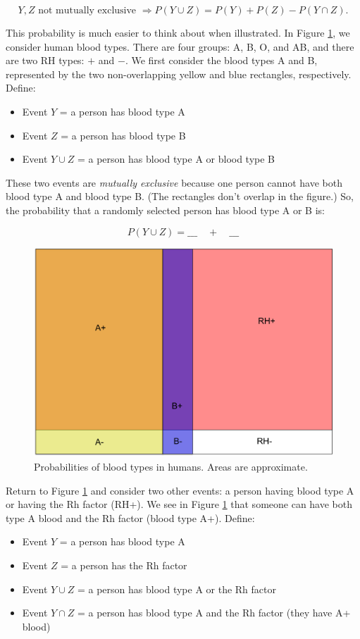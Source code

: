 \documentclass[]{book}
\providecommand{\tightlist}{%
  \setlength{\itemsep}{0pt}\setlength{\parskip}{0pt}}
\theoremstyle{definition}
\theoremstyle{definition}
\theoremstyle{remark}
\begin{document}
\[ Y,Z \text{ not mutually exclusive } \Rightarrow P(Y \cup Z) = P(Y) + P(Z) - P(Y \cap Z).\]

This probability is much easier to think about when illustrated. In
Figure \ref{fig:bloodvendiag}, we consider human blood types. There are
four groups: A, B, O, and AB, and there are two RH types: \(+\) and
\(-\). We first consider the blood types A and B, represented by the two
non-overlapping yellow and blue rectangles, respectively. Define:

\begin{itemize}
\tightlist
\item
  Event \(Y\) = a person has blood type A
\item
  Event \(Z\) = a person has blood type B
\item
  Event \(Y \cup Z\) = a person has blood type A or blood type B
\end{itemize}

These two events are \emph{mutually exclusive} because one person cannot
have both blood type A and blood type B. (The rectangles don't overlap
in the figure.) So, the probability that a randomly selected person has
blood type A or B is:

\[ P(Y \cup Z) = \_\_\_ \quad + \quad \_\_\_\]

\begin{figure}[h]

{\centering \includegraphics[width=.5\linewidth]{img/bloodvenndiag} 

}

\caption{Probabilities of blood types in humans. Areas are approximate.}\label{fig:bloodvendiag}
\end{figure}

Return to Figure \ref{fig:bloodvendiag} and consider two other events: a
person having blood type A or having the Rh factor (RH+). We see in
Figure \ref{fig:bloodvendiag} that someone can have both type A blood
and the Rh factor (blood type A+). Define:

\begin{itemize}
\tightlist
\item
  Event \(Y\) = a person has blood type A
\item
  Event \(Z\) = a person has the Rh factor
\item
  Event \(Y \cup Z\) = a person has blood type A or the Rh factor
\item
  Event \(Y \cap Z\) = a person has blood type A and the Rh factor (they
  have A+ blood)
\end{itemize}
\end{document}
